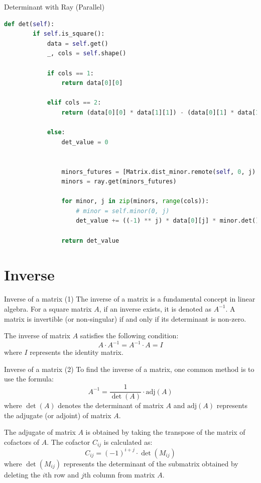 \documentclass{beamer}
\begin{document}
\begin{frame}[fragile]{Determinant with Ray (Parallel)}

    \begin{lstlisting}[language=Python]
    def det(self):
        if self.is_square():
            data = self.get()
            _, cols = self.shape()
    
            if cols == 1:
                return data[0][0]
    
            elif cols == 2:
                return (data[0][0] * data[1][1]) - (data[0][1] * data[1][0])
    
            else:
                det_value = 0
    
    
                minors_futures = [Matrix.dist_minor.remote(self, 0, j) for j in range(cols)]
                minors = ray.get(minors_futures)
    
                for minor, j in zip(minors, range(cols)):
                    # minor = self.minor(0, j)
                    det_value += ((-1) ** j) * data[0][j] * minor.det()
    
                return det_value
    \end{lstlisting}
\end{frame}




\section{Inverse}
\begin{frame}{Inverse of a matrix (1)}
    The \alert{inverse of a matrix} is a fundamental concept in linear algebra. For a square matrix $A$, if an inverse exists, it is denoted as $A^{-1}$. A matrix is invertible (or non-singular) if and only if its determinant is non-zero.

    The inverse of matrix $A$ satisfies the following condition:
    $$
        A \cdot A^{-1} = A^{-1} \cdot A = I
    $$
    where $I$ represents the identity matrix.

\end{frame}

\begin{frame}{Inverse of a matrix (2)}
    To find the inverse of a matrix, one common method is to use the formula:
    $$
        A^{-1} = \frac{1}{\det(A)} \cdot \text{adj}(A)
    $$
    where $\det(A)$ denotes the determinant of matrix $A$ and $\text{adj}(A)$ represents the adjugate (or adjoint) of matrix $A$.

    The adjugate of matrix $A$ is obtained by taking the transpose of the matrix of cofactors of $A$. The cofactor $C_{ij}$ is calculated as:
    $$
        C_{ij} = (-1)^{i+j} \cdot \det(M_{ij})
    $$
    where $\det(M_{ij})$ represents the determinant of the submatrix obtained by deleting the $i$th row and $j$th column from matrix $A$.
\end{frame}
\end{document}
